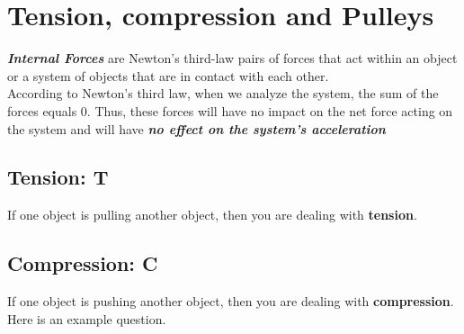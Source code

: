 \section{Tension, compression and Pulleys}
\textbf{\textit{Internal Forces}} are Newton's third-law pairs of forces that act within an object or a system of objects
that are in contact with each other. \\

According to Newton's third law, when we analyze the system, the sum of the forces equals 0. 
Thus, these forces will have no impact on the net force acting on the system and will have 
\textbf{\textit{no effect on the system's acceleration}}

\subsection{Tension: T}
If one object is pulling another object, then you are dealing with \textbf{tension}.

\subsection{Compression: C}
If one object is pushing another object, then you are dealing with \textbf{compression}.
\\

Here is an example question.
